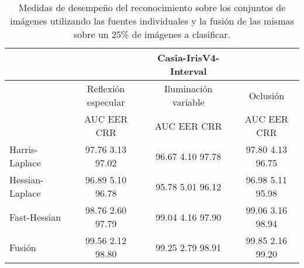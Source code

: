 \begin{table}[h]
\begin{center}
\begin{tabular}{@{}lccc@{}}
\toprule
&& Casia-IrisV4-Interval & \\ \hline
&Reflexión especular		&  	Iluminación variable		& Oclusión \\ \hline
&AUC  \phantom{aa} EER  \phantom{aa} CRR &  	AUC  \phantom{aa} EER  \phantom{aa} CRR		& AUC  \phantom{aa} EER  \phantom{aa} CRR \\ \hline
Harris-Laplace& 97.76 \phantom{aa} 3.13  \phantom{aa} 97.02 &  	96.67 \phantom{aa} 4.10  \phantom{aa}97.78		& 97.80 \phantom{aa} 4.13 \phantom{aa} 96.75 \\
Hessian-Laplace& 96.89 \phantom{aa} 5.10  \phantom{aa} 96.78 &  	95.78 \phantom{aa} 5.01 \phantom{aa} 96.12 & 96.98 \phantom{aa} 5.11 \phantom{aa} 95.98\\
Fast-Hessian& 98.76  \phantom{aa}2.60 \phantom{aa}  97.79 &  	99.04 \phantom{aa} 4.16 \phantom{aa}97.90		& 99.06  \phantom{aa}3.16 \phantom{aa} 98.94 \\
Fusión& 99.56 \phantom{aa} 2.12  \phantom{aa}98.80 &  	99.25  \phantom{aa}2.79 \phantom{aa} 98.91		& 99.85 \phantom{aa} 2.16  \phantom{aa}99.20 \\ \hline

\end{tabular}
\end{center}
\caption{Medidas de desempeño del reconocimiento sobre los conjuntos de imágenes utilizando las fuentes individuales y la fusión de las mismas sobre un 25\% de imágenes a clasificar.}
\label{my_tabla}
\end{table}

